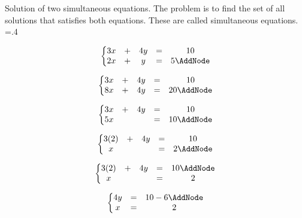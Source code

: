 \documentclass[]{article}
\begin{document}

\begin{minipage}{10cm}
  Solution of two simultaneous equations. The problem is to find the set of all solutions that satisfies both equations. These are called simultaneous equations.
  \displaywidth=.4\linewidth
	\begin{NodesList}[dy=3pt,margin=5cm]
	\[  \displaywidth=.4\linewidth
	 \left\{\begin{matrix}
	3x 	&+&	4y  		&=&	10\\
	2x		&+& 	y		&=&	5  \AddNode\\
	\end{matrix}\right. \] 

	\bigskip

	\[\displaywidth=.4\linewidth \left\{\begin{matrix}
	3x 	&+&	4y  		&=&	10\\
	8x		&+& 	4y		&=&	20  \AddNode\\
	\end{matrix}\right. \] 

	\bigskip

	\[\displaywidth=.4\linewidth \left\{\begin{matrix}
	3x 	&+&	4y  		&=&	10  \\
	5x		&& 			  &=&	10  \AddNode\\
	\end{matrix}\right. \] 

	\bigskip

	\[\displaywidth=.4\linewidth \left\{\begin{matrix}
	3(2) 	&+&	4y  		&=&	10\\
	x		&& 			  &=&	2  \AddNode\\
	\end{matrix}\right. \] 

	\bigskip

	\[\displaywidth=.4\linewidth \left\{\begin{matrix}
	3(2) 	&+&	4y  		&=&	10\AddNode\\
	x		&& 			  &=&	2  \\
	\end{matrix}\right. \] 

	\bigskip

	\[\displaywidth=.4\linewidth \left\{\begin{matrix}
	4y  		&=&	10-6\AddNode\\
	x				  &=&	2  \\
	\end{matrix}\right. \] 


\end{NodesList}
\end{minipage}
\end{document}
